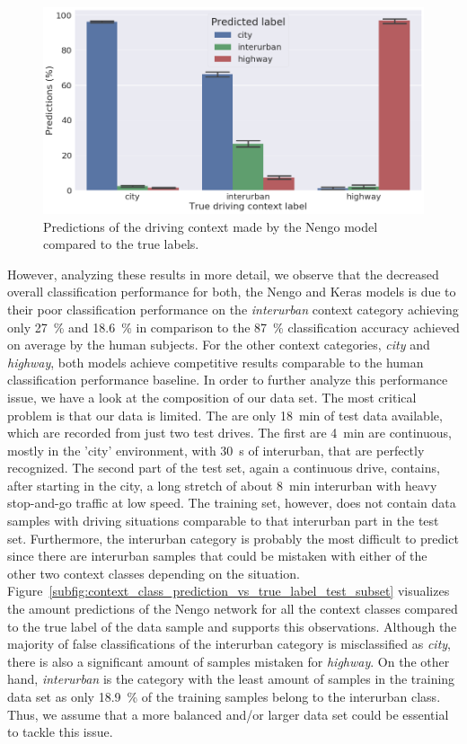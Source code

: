 \begin{figure}[t]
    \centering
    \includegraphics[width=0.9\linewidth]{imgs/context_class_prediction_vs_true_label.png}
    \caption{Predictions of the driving context made by the \ac{Nengo} model compared to the true labels.}
    \label{fig:context_class_prediction_vs_true_label}
\end{figure}

However, analyzing these results in more detail, we observe that the decreased overall classification performance for both, the \ac{Nengo} and Keras models is due to their poor classification performance on the \emph{interurban} context category achieving only \SI{27}{\percent} and \SI{18.6}{\percent} in comparison to the \SI{87}{\percent} classification accuracy achieved on average by the human subjects.
For the other context categories, \emph{city} and \emph{highway}, both models achieve competitive results comparable to the human classification performance baseline.
In order to further analyze this performance issue, we have a look at the composition of our data set.
The most critical problem is that our data is limited.
The are only \SI{18}{\minute} of test data available, which are recorded from just two test drives.
The first are \SI{4}{\minute} are continuous, mostly in the 'city' environment, with \SI{30}{\second} of interurban, that are perfectly recognized.
The second part of the test set, again a continuous drive, contains, after starting in the city, a long stretch of about \SI{8}{\minute} interurban with heavy stop-and-go traffic at low speed.
The training set, however, does not contain data samples with driving situations comparable to that interurban part in the test set.
Furthermore, the interurban category is probably the most difficult to predict since there are interurban samples that could be mistaken with either of the other two context classes depending on the situation.
Figure~\ref{subfig:context_class_prediction_vs_true_label_test_subset} visualizes the amount predictions of the \ac{Nengo} network for all the context classes compared to the true label of the data sample and supports this observations.
Although the majority of false classifications of the interurban category is misclassified as \emph{city}, there is also a significant amount of samples mistaken for \emph{highway}.
On the other hand, \emph{interurban} is the category with the least amount of samples in the training data set as only \SI{18.9}{\percent} of the training samples belong to the interurban class.
Thus, we assume that a more balanced and/or larger data set could be essential to tackle this issue.

